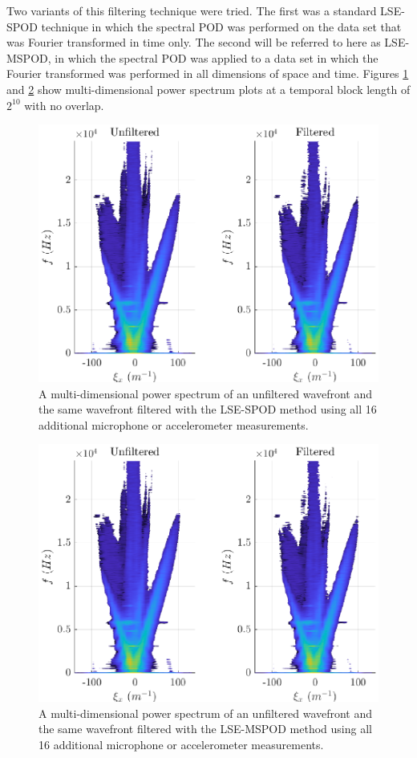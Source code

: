 Two variants of this filtering technique were tried.
The first was a standard LSE-SPOD technique in which the spectral POD was performed on the data set that was Fourier transformed in time only.
The second will be referred to here as LSE-MSPOD, in which the spectral POD was applied to a data set in which the Fourier transformed was performed in all dimensions of space and time.
Figures \ref{fig:07_lse_spod} and \ref{fig:07_lse_mspod} show multi-dimensional power spectrum plots at a temporal block length of $2^{10}$ with no overlap.
\begin{figure}
  \centering
  \includegraphics{../matlab/07_multiple_sensor_filtering/lse_spod.eps}
  \caption{A multi-dimensional power spectrum of an unfiltered wavefront and the same wavefront filtered with the LSE-SPOD method using all 16 additional microphone or accelerometer measurements.  }
  \label{fig:07_lse_spod}
\end{figure}
\begin{figure}
  \centering
  \includegraphics{../matlab/07_multiple_sensor_filtering/lse_mspod.eps}
  \caption{A multi-dimensional power spectrum of an unfiltered wavefront and the same wavefront filtered with the LSE-MSPOD method using all 16 additional microphone or accelerometer measurements.  }
  \label{fig:07_lse_mspod}
\end{figure}
